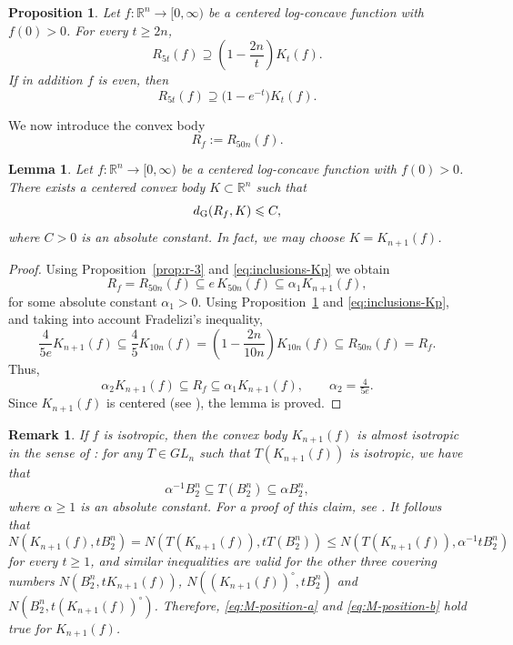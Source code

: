\documentclass[11pt,leqno]{article}
\newtheorem{lemma}[theorem]{Lemma}
\newtheorem{proposition}[theorem]{Proposition}
\newtheorem{remark}[theorem]{Remark}
\theoremstyle{definition}
\theoremstyle{remark}
\numberwithin{equation}{section}
\newcommand{\ls}{\leqslant}
\newcommand{\gr}{\geqslant}
\begin{document}
\begin{proposition}\label{prop:r-4}
Let $f:\mathbb{R}^n \to [0,\infty)$ be a centered log-concave function with $f(0)>0$.  For every $t\gr 2n$,
$$R_{5t}(f)\supseteq \left(1-\frac{2n}{t}\right)K_t(f).$$
If in addition $f$ is even, then
$$R_{5t}(f)\supseteq \bigl(1-e^{-t}\bigr)K_t(f).$$
\end{proposition}

We now introduce the convex body
\begin{equation}\label{eq:def-Rf}R_f := R_{50n}(f).\end{equation}

\begin{lemma}\label{lem:bounded-gd}Let $f:\mathbb{R}^n \to [0,\infty)$ be a centered log-concave function with $f(0)>0$. 
There exists a centered convex body $K\subset\mathbb{R}^n$ such that
$$d_{{\rm G}}(R_f,K)\ls C,$$
where $C>0$ is an absolute constant. In fact, we may choose $K=K_{n+1}(f)$.
\end{lemma}

\begin{proof}Using Proposition~\ref{prop:r-3} and \eqref{eq:inclusions-Kp} we obtain
\begin{equation}\label{eq:R-K-1}
R_f = R_{50n}(f)\subseteq e\, K_{50n}(f)\subseteq \alpha_1 K_{n+1}(f),
\end{equation}
for some absolute constant $\alpha_1>0$.  
Using Proposition~\ref{prop:r-4} and \eqref{eq:inclusions-Kp}, and taking into account Fradelizi's inequality,
\begin{equation}\label{eq:R-K-2}
\frac{4}{5e} K_{n+1}(f)\subseteq \frac{4}{5} K_{10n}(f)=
\left(1-\frac{2n}{10n}\right)K_{10n}(f)\subseteq R_{50n}(f)= R_f.
\end{equation}
Thus,
\begin{equation}\label{eq:R-K}
\alpha_2 K_{n+1}(f)\subseteq R_f \subseteq \alpha_1 K_{n+1}(f),\qquad\alpha_2=\tfrac{4}{5e}.
\end{equation}
Since $K_{n+1}(f)$ is centered (see \cite[Proposition~2.5.3]{BGVV-book}),
the lemma is proved.\end{proof}

\begin{remark}\label{rem:almost}\rm If $f$ is isotropic, then the convex body $K_{n+1}(f)$ is almost isotropic in the sense of \cite[Definition~2.5.11]{BGVV-book}:
for any $T\in GL_n$ such that $T(K_{n+1}(f))$ is isotropic, we have that 
$$\alpha^{-1}B_2^n\subseteq T(B_2^n)\subseteq \alpha B_2^n,$$
where $\alpha \gr 1$ is an absolute constant. For a proof of this claim, see \cite[Proposition~2.5.12]{BGVV-book}. It follows that
$$N(K_{n+1}(f), tB_2^n)=N(T(K_{n+1}(f)), tT(B_2^n))\ls N(T(K_{n+1}(f)), \alpha^{-1}tB_2^n)$$
for every $t\gr 1$, and similar inequalities are valid for the other three covering numbers $N(B_2^n, tK_{n+1}(f))$, $N((K_{n+1}(f))^{\circ},tB_2^n)$ and 
$N(B_2^n, t(K_{n+1}(f))^{\circ})$. Therefore, \eqref{eq:M-position-a} and \eqref{eq:M-position-b}
hold true for $K_{n+1}(f)$.
\end{remark}
\end{document}
